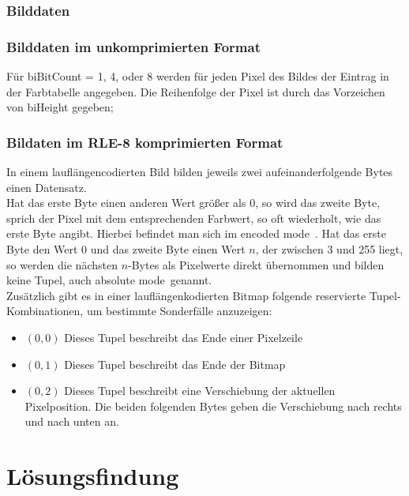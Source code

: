 \documentclass[11pt]{scrartcl}
\begin{document}
\subsubsection{Bilddaten}
\subsubsection*{Bilddaten im unkomprimierten Format}

Für biBitCount = 1, 4, oder 8 werden für jeden Pixel des Bildes der Eintrag in der Farbtabelle angegeben. Die Reihenfolge der Pixel ist durch das Vorzeichen von biHeight gegeben;

\subsubsection*{Bildaten im RLE-8 komprimierten Format}

In einem lauflängencodierten Bild bilden jeweils zwei aufeinanderfolgende Bytes einen Datensatz.\\ Hat das erste Byte einen anderen Wert größer als 0, so wird das zweite Byte, sprich der Pixel mit dem entsprechenden Farbwert, so oft wiederholt, wie das erste Byte angibt. Hierbei befindet man sich im \frqq encoded mode\flqq~. Hat das erste Byte den Wert 0 und das zweite Byte einen Wert $n$, der zwischen 3 und 255 liegt, so werden die nächsten $n$-Bytes als Pixelwerte direkt übernommen und bilden keine Tupel, auch \frqq absolute mode\flqq~genannt. \\

Zusätzlich gibt es in einer lauflängenkodierten Bitmap folgende reservierte Tupel-Kombinationen, um bestimmte Sonderfälle anzuzeigen:

\begin{itemize}
\item $(0,0)$ Dieses Tupel beschreibt das Ende einer Pixelzeile
\item $(0,1)$ Dieses Tupel beschreibt das Ende der Bitmap
\item $(0,2)$ Dieses Tupel beschreibt eine Verschiebung der aktuellen Pixelposition. Die beiden folgenden Bytes geben die Verschiebung nach rechts und nach unten an.
\end{itemize}


\section{Lösungsfindung}
\end{document}
